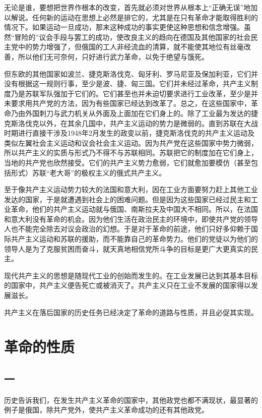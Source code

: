\documentclass[12pt,oneside]{book}
\begin{document}
\begin{common-format}
无论是谁，要想把世界作根本的改变，首先就必须对世界从根本上“正确无误”地加以解说。任何新的运动在思想上必然是排它的，尤其是在只有革命才能取得胜利的情况下。如果运动一旦成功，那末这种成功的事实更使这种思想和信念增强。虽然“冒险的”议会手段与罢工的成功，使改良主义的趋向在德国及其他国家的社会民主党中的势力增强了，但俄国的工人非经流血的清算，就不能使其地位有丝毫改善，所以他们无可奈何，只好进行武力革命，以免于绝望与饿死。

但东欧的其他国家如波兰、捷克斯洛伐克、匈牙利、罗马尼亚及保加利亚，它们并没有根据这一规则行事，至少是波、捷、匈三国。它们并未经过革命，共产主义制度乃是苏联军队强加于它们的。它们甚至也并未迫切要求进行工业改革，至少是并未要求用共产党的方法，因为有些国家已经达到改革了。总之，在这些国家中，革命乃由外国刺刀与武力机关从外面及上面加在它们身上的。除了工业最为发达的捷克斯洛伐克以外，在其余几国中，共产主义运动的势力是微弱的。直到苏联在大战时期进行直接干涉及1948年2月发生的政变以前，捷克斯洛伐克的共产主义运动及类似左翼社会主义运动和议会社会主义运动。因为共产党在这些国家中势力微弱，所以共产主义的实质与形式乃不得不与苏联相同。苏联把它的制度加在它们身上，当地的共产党也欣然接受。它们的共产主义势力愈弱，它们就愈加要模仿（甚至包括形式）苏联“老大哥”的极权主义的俄式共产主义。

至于像共产主义运动势力较大的法国和意大利，因在工业方面要努力赶上其他工业发达的国家，于是就遭遇到社会上的困难问题。但是因为这些国家已经过民主和工业革命，他们的共产主义运动就与俄国、南斯拉夫及中国大不相同。所以，在法国和意大利没有革命的机会。因为他们生活在政治民主的环境中，即使共产党的领导人也不能完全除去对议会政治的幻想。于是对于革命的前途，他们只好多仰赖于国际共产主义运动和苏联的援助，而不能靠自己的革命势力。他们的党徒以为他们的领导人是为了克服贫困而奋斗，就天真地相信党所斗争的目标是更广大更真实的民主。

现代共产主义的思想是随现代工业的创始而发生的。在工业发展已达到其基本目标的国家中，共产主义便告死亡或被消灭了。共产主义只在工业不发展的国家得以发展滋长。

共产主义在落后国家的历史任务已经决定了革命的道路与性质，并且必促其实现。


\chapter{革命的性质}
\section{一}
历史告诉我们，在发生共产主义革命的国家中，其他政党也都不满现状，最显著的例子是俄国，除共产党外，使共产主义革命成功的还有其他政党。


\end{common-format}
\end{document}
